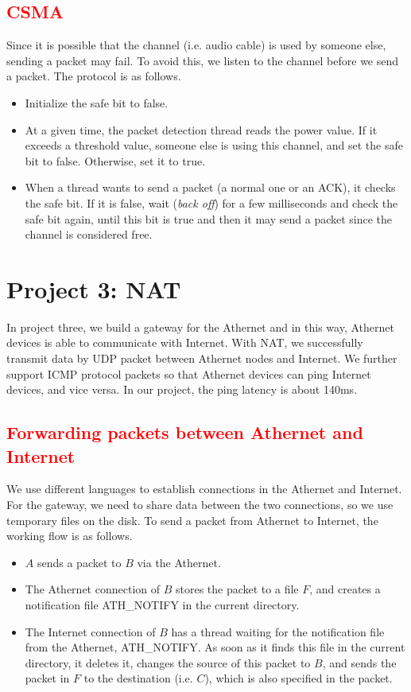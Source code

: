 \documentclass[11pt, conference]{IEEEtran}
\newcommand{\tcr}{\textcolor{red}}
\begin{document}
\subsection{\tcr{CSMA}}

Since it is possible that the channel (i.e. audio cable) is used by someone else, sending a packet may fail. To avoid this, we listen to the channel before we send a packet. The protocol is as follows.
\begin{itemize}
\item Initialize the safe bit to false.
\item At a given time, the packet detection thread reads the \textsf{power} value. If it exceeds a threshold value, someone else is using this channel, and set the safe bit to false. Otherwise, set it to true.
\item When a thread wants to send a packet (a normal one or an ACK), it checks the safe bit. If it is false, wait (\emph{back off}) for a few milliseconds and check the safe bit again, until this bit is true and then it may send a packet since the channel is considered free.
\end{itemize}

\section{Project 3: NAT}

In project three, we build a gateway for the Athernet and in this way, Athernet devices is able to communicate with Internet. With NAT, we successfully transmit data by UDP packet between Athernet nodes and Internet. 
We further support ICMP protocol packets so that Athernet devices can ping Internet devices, and vice versa. In our project, the ping latency is about 140ms.

\subsection{\tcr{Forwarding packets between Athernet and Internet}}

We use different languages to establish connections in the Athernet and Internet. For the gateway, we need to share data between the two connections, so we use temporary files on the disk. To send a packet from Athernet to Internet, the working flow is as follows.
\begin{itemize}
\item $A$ sends a packet to $B$ via the Athernet.
\item The Athernet connection of $B$ stores the packet to a file $F$, and creates a notification file \textsf{ATH\_NOTIFY} in the current directory.
\item The Internet connection of $B$ has a thread waiting for the notification file from the Athernet, \textsf{ATH\_NOTIFY}. As soon as it finds this file in the current directory, it deletes it, changes the source of this packet to $B$, and sends the packet in $F$ to the destination (i.e. $C$), which is also specified in the packet.
\end{itemize}
\end{document}
